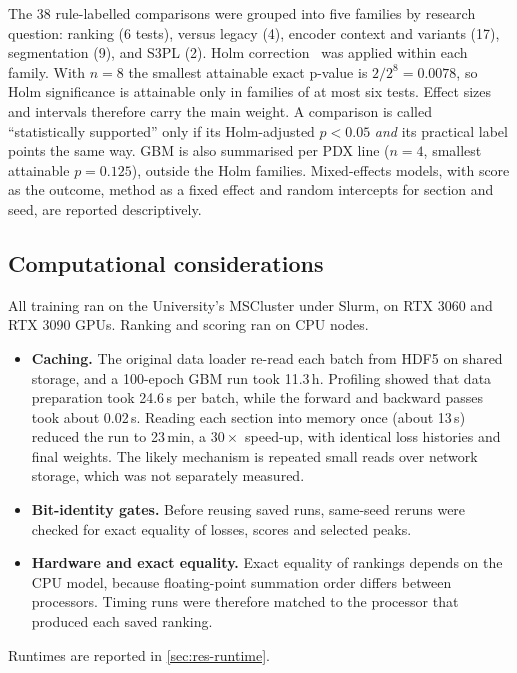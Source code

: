 The 38 rule-labelled comparisons were grouped into five families by research
question: ranking (6 tests), versus legacy (4), encoder context and variants
(17), segmentation (9), and S3PL (2). Holm correction~\citep{holm1979simple} was
applied within each family. With $n=8$ the smallest attainable exact p-value is
$2/2^8=0.0078$, so Holm significance is attainable only in families of at most
six tests. Effect sizes and intervals therefore carry the main weight. A
comparison is called ``statistically supported'' only if its Holm-adjusted
$p<0.05$ \emph{and} its practical label points the same way. GBM is also
summarised per PDX line ($n=4$, smallest attainable $p=0.125$), outside the
Holm families. Mixed-effects models, with score as the outcome, method as a
fixed effect and random intercepts for section and seed, are reported
descriptively.

\subsection{Computational considerations}
\label{sec:compute}
All training ran on the University's MSCluster under Slurm, on RTX 3060 and
RTX 3090 GPUs. Ranking and scoring ran on CPU nodes.
\begin{itemize}
  \item \textbf{Caching.} The original data loader re-read each batch from HDF5
        on shared storage, and a 100-epoch GBM run took 11.3\,h. Profiling
        showed that data preparation took 24.6\,s per batch, while the forward
        and backward passes took about 0.02\,s. Reading each section into memory
        once (about 13\,s) reduced the run to 23\,min, a $30\times$ speed-up,
        with identical loss histories and final weights. The likely mechanism is
        repeated small reads over network storage, which was not separately
        measured.
  \item \textbf{Bit-identity gates.} Before reusing saved runs, same-seed
        reruns were checked for exact equality of losses, scores and selected
        peaks.
  \item \textbf{Hardware and exact equality.} Exact equality of rankings
        depends on the CPU model, because floating-point summation order
        differs between processors. Timing runs were therefore matched to the
        processor that produced each saved ranking.
\end{itemize}
Runtimes are reported in \cref{sec:res-runtime}.
